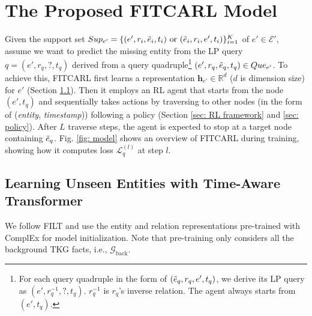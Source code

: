 \documentclass[runningheads]{llncs}
\begin{document}
\section{The Proposed FITCARL Model}
Given the support set $Sup_{e'} = \{(e',r_i,\Tilde{e}_i,t_i) \ \text{or}\  (\Tilde{e}_i,r_i,e',t_i)\}^K_{i=1}$ of $e' \in \mathcal{E}'$, 
assume we want to predict the missing entity from the LP query 
$q = (e', r_q, ?, t_q)$ derived from a query quadruple\footnote{For each query quadruple in the form of $(\Tilde{e}_q, r_q, e', t_q)$, we derive its LP query as $(e', r_q^{-1}, ?, t_q)$. $r_q^{-1}$ is $r_q$'s inverse relation. The agent always starts from $(e', t_q)$.} $(e', r_q, \Tilde{e}_q, t_q) \in Que_{e'}$. 
To achieve this, FITCARL first learns a representation $\mathbf{h}_{e'} \in \mathbb{R}^d $ 
($d$ is dimension size) for $e'$ (Section \ref{sec: unseen entity learning}). 
Then it employs an RL agent that starts from the node $(e', t_q)$ and sequentially 
takes actions by traversing to other nodes (in the form of (\textit{entity}, \textit{timestamp})) following a policy (Section \ref{sec: RL framework} and \ref{sec: policy}). 
After $L$ traverse steps, the agent is expected to stop at a target node 
containing $\Tilde{e}_q$. 
Fig. \ref{fig: model} shows an overview of FITCARL during training, showing how it computes loss $\mathcal{L}_q^{(l)}$ at step $l$.
\subsection{Learning Unseen Entities with Time-Aware Transformer}
\label{sec: unseen entity learning}
We follow FILT \cite{ding2022few} and use the entity and relation representations pre-trained with ComplEx 
\cite{DBLP:conf/icml/TrouillonWRGB16} for model initialization. 
Note that pre-training only considers all the background TKG facts, i.e., $\mathcal{G}_{\text{back}}$. 
\end{document}
